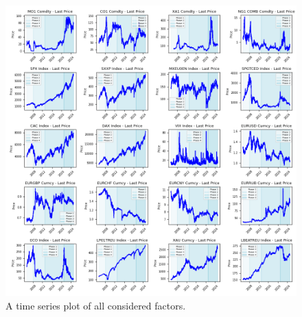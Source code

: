 \documentclass[12pt, letterpaper]{article}
\begin{document}
\begin{figure}[ht]
\centering
\includegraphics[width=1\textwidth]{graphics/timegraphs.png}
\caption{A time series plot of all considered factors.}
\label{fig:timegraphs}
\end{figure}
\end{document}
